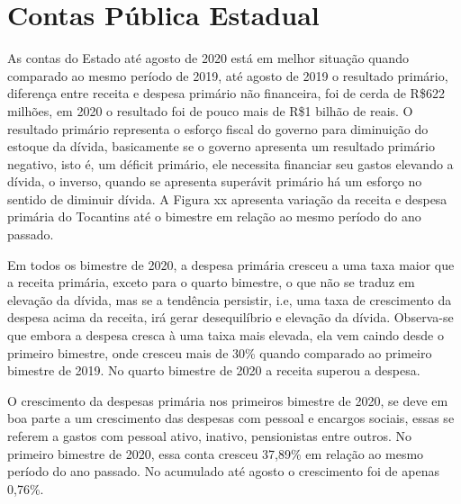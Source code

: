 \hypertarget{contas-puxfablica-estadual}{%
\chapter{Contas Pública Estadual}\label{contas-puxfablica-estadual}}

As contas do Estado até agosto de 2020 está em melhor situação quando
comparado ao mesmo período de 2019, até agosto de 2019 o resultado
primário, diferença entre receita e despesa primário não financeira, foi
de cerda de R\$622 milhões, em 2020 o resultado foi de pouco mais de
R\$1 bilhão de reais. O resultado primário representa o esforço fiscal
do governo para diminuição do estoque da dívida, basicamente se o
governo apresenta um resultado primário negativo, isto é, um déficit
primário, ele necessita financiar seu gastos elevando a dívida, o
inverso, quando se apresenta superávit primário há um esforço no sentido
de diminuir dívida. A Figura xx apresenta variação da receita e despesa
primária do Tocantins até o bimestre em relação ao mesmo período do ano
passado.

Em todos os bimestre de 2020, a despesa primária cresceu a uma taxa
maior que a receita primária, exceto para o quarto bimestre, o que não
se traduz em elevação da dívida, mas se a tendência persistir, i.e, uma
taxa de crescimento da despesa acima da receita, irá gerar desequilíbrio
e elevação da dívida. Observa-se que embora a despesa cresca à uma taixa
mais elevada, ela vem caindo desde o primeiro bimestre, onde cresceu
mais de 30\% quando comparado ao primeiro bimestre de 2019. No quarto
bimestre de 2020 a receita superou a despesa.

O crescimento da despesas primária nos primeiros bimestre de 2020, se
deve em boa parte a um crescimento das despesas com pessoal e encargos
sociais, essas se referem a gastos com pessoal ativo, inativo,
pensionistas entre outros. No primeiro bimestre de 2020, essa conta
cresceu 37,89\% em relação ao mesmo período do ano passado. No acumulado
até agosto o crescimento foi de apenas 0,76\%.

